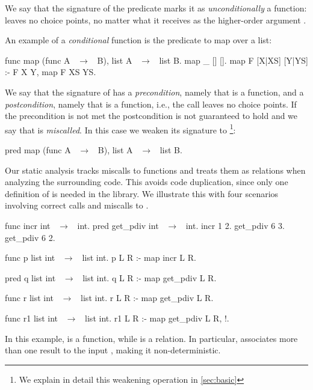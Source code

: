 %
We say that the signature of the  predicate marks it as \emph{unconditionally}
a function:  leaves no choice points, no matter what it receives as
the higher-order argument .

An example of a \emph{conditional} function is
the predicate to map over a list:
\begin{elpicode}
func map (func A ~$\to$~ B), list A ~$\to$~ list B.
map _ [] [].
map F [X|XS] [Y|YS] :- F X Y, map F XS YS.
\end{elpicode}
%
We say that the signature of  has a \emph{precondition}, namely
that  is a function, and a \emph{postcondition}, namely that
 is a function, i.e., the call  leaves
no choice points.
If the precondition is not met the postcondition is not guaranteed to hold and we say
that  is \emph{miscalled}. In this case we weaken its signature to%
\footnote{We explain in detail this weakening operation in \cref{sec:basic}}:
%
\begin{elpicode}
pred map (func A ~$\to$~ B), list A ~$\to$~ list B.
\end{elpicode}
%
Our static analysis tracks miscalls to functions and treats them as
relations when analyzing the surrounding code. This avoids code duplication,
since only one definition of  is needed in the library. We illustrate
this with four scenarios involving correct calls and miscalls to .

\begin{elpicode}
func incr int ~$\to$~ int.             pred get_pdiv int ~$\to$~ int.
incr 1 2.                         get_pdiv 6 3. get_pdiv 6 2.


func p list int ~$\to$~ list int.
p L R :- map incr L R.            %

pred q list int ~$\to$~ list int.
q L R :- map get_pdiv L R.        %

func r list int ~$\to$~ list int.
r L R :- map get_pdiv L R.        %

func r1 list int ~$\to$~ list int.
r1 L R :- map get_pdiv L R, !.    %
\end{elpicode}

In this example,  is a function, while  is a relation.
In particular,  associates more than one result to the input
, making it non-deterministic.

